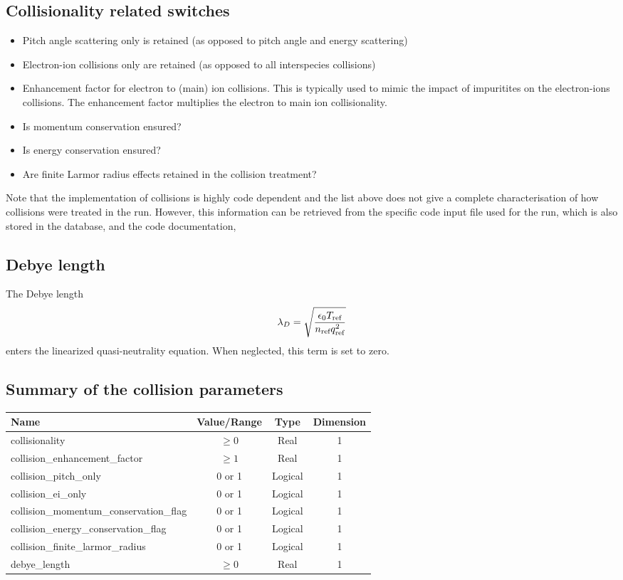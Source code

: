 \documentclass[fleqn]{report}
\begin{document}
\subsection{Collisionality related switches} \label{sec:colswitches}
\begin{itemize}
\item Pitch angle scattering only is retained (as opposed to pitch angle and energy scattering)
\item Electron-ion collisions only are retained (as opposed to all interspecies collisions)
\item Enhancement factor for electron to (main) ion collisions. This is typically used to mimic the impact of impuritites on the electron-ions collisions. The enhancement factor multiplies the electron to main ion collisionality.
\item Is momentum conservation ensured?
\item Is energy conservation ensured?
\item Are finite Larmor radius effects retained in the collision treatment?
\end{itemize}
Note that the implementation of collisions is highly code dependent and the list above does not give a complete characterisation of how collisions were treated in the run. However, this information can be retrieved from the specific code input file used for the run, which is also stored in the database, and the code documentation,\\

\subsection{Debye length}
The Debye length
\begin{equation}
 \lambda_{D}= \sqrt{\frac{\epsilon_0 T_{\textrm{ref}}}{n_{\textrm{ref}} q_{\textrm{ref}}^2}}
\end{equation}
enters the linearized quasi-neutrality equation. When neglected, this term is set to zero.

\subsection{Summary of the collision parameters}
\begin{tabularx}{\textwidth}{|L|S|S|S|}
\hline
Name & Value/Range & Type & Dimension \\
\hline
collisionality & $\geq 0$ & Real & 1 \\
collision\_enhancement\_factor & $\geq 1$ & Real & 1 \\
collision\_pitch\_only & 0 or 1 & Logical & 1 \\
collision\_ei\_only & 0 or 1 & Logical & 1 \\
collision\_momentum\_conservation\_flag & 0 or 1 & Logical & 1 \\
collision\_energy\_conservation\_flag & 0 or 1 & Logical & 1 \\
collision\_finite\_larmor\_radius & 0 or 1 & Logical & 1 \\
debye\_length & $\geq 0$ & Real & 1 \\
\hline
\end{tabularx}
\end{document}
